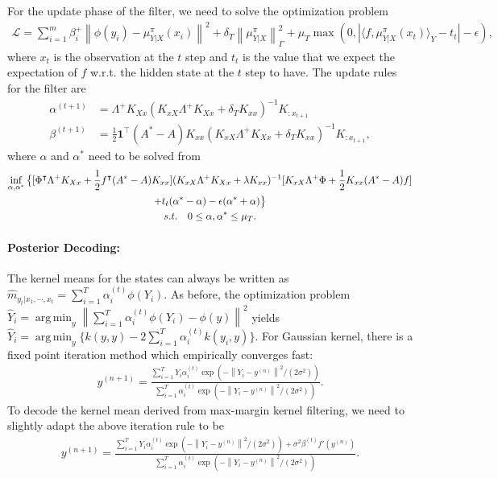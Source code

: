 \documentclass[a4paper]{article}
\renewcommand{\bf}{\mathbf}
\renewcommand{\cal}{\mathcal}
\newcommand{\norm}[1]{\left\lVert#1\right\rVert}
\newcommand{\T}{\intercal}
\DeclareMathOperator*{\argmin}{arg\,min}
\begin{document}
For the update phase of the filter, we need to solve the optimization problem
\begin{align}
\cal{L} = \sum_{i=1}^{m} \beta_i^+ \norm{\phi(y_i) - \mu_{Y|X}^\pi(x_i)}^2 + \delta_T\norm{\mu_{Y|X}^\pi}_\Gamma^2 + \mu_T \max (0, |\langle f, \mu_{Y|X}^\pi(x_t)\rangle_{Y} - t_t| - \epsilon),
\end{align}
where $x_t$ is the observation at the $t$ step and $t_t$ is the value that we expect the expectation of $f$ w.r.t. the hidden state at the $t$ step to have.
The update rules for the filter are
\begin{align}
\alpha^{(t+1)} &= \Lambda^+ K_{Xx}(K_{xX}\Lambda^+K_{Xx}+\delta_T K_{xx})^{-1}K_{:x_{t+1}}\\
\beta^{(t+1)} &= \frac{1}{2} \bf{1}^\T (A^*-A) K_{xx}(K_{xX}\Lambda^+K_{Xx}+\delta_T K_{xx})^{-1}K_{:x_{t+1}},
\end{align}
where $\alpha$ and $\alpha^*$ need to be solved from
\begin{gather}
\inf_{\alpha,\alpha^*} \big\{ [\Phi^\T \Lambda^+ K_{Xx} + \frac{1}{2} f^\T (A^* - A)K_{xx}](K_{xX}\Lambda^+ K_{Xx} +\lambda K_{xx})^{-1}[K_{xX}\Lambda^+\Phi + \frac{1}{2} K_{xx} (A^* - A)f]\notag\\+ t_t(\alpha^* - \alpha) - \epsilon  (\alpha^* + \alpha)\big\}\\
 s.t.\quad 0 \leq \alpha,\alpha^* \leq \mu_T.\notag
\end{gather}

\paragraph{Posterior Decoding:} The kernel means for the states can always be written as $\hat{m}_{y_t|x_1,\cdots,x_t} = \sum_{i=1}^T \alpha_i^{(t)}\phi(Y_i)$. As before, the optimization problem $\hat{Y}_i = \argmin_{y}\norm{\sum_{i=1}^T \alpha_i^{(t)}\phi(Y_i) - \phi(y)}^2$ yields $\hat{Y}_i = \argmin_y \{ k(y,y) - 2\sum_{i=1}^T \alpha_i^{(t)}k(y_i,y)\}$. For Gaussian kernel, there is a fixed point iteration method which empirically converges fast:
\begin{align}
y^{(n+1)} = \frac{\sum_{i=1}^T Y_i \alpha_i^{(t)}\exp(-\norm{Y_i-y^{(n)}}^2/(2\sigma^2))}{\sum_{i=1}^T \alpha_i^{(t)}\exp(-\norm{Y_i-y^{(n)}}^2/(2\sigma^2))}.
\end{align}
To decode the kernel mean derived from max-margin kernel filtering, we need to slightly adapt the above iteration rule to be
\begin{align}
y^{(n+1)} = \frac{\sum_{i=1}^T Y_i\alpha_i^{(t)}\exp(-\norm{Y_i-y^{(n)}}^2/(2\sigma^2)) + \sigma^2 \beta^{(t)} f'(y^{(n)}) }{\sum_{i=1}^T\alpha_i^{(t)} \exp(-\norm{Y_i-y^{(n)}}^2/(2\sigma^2))}.
\end{align}

\end{document}
